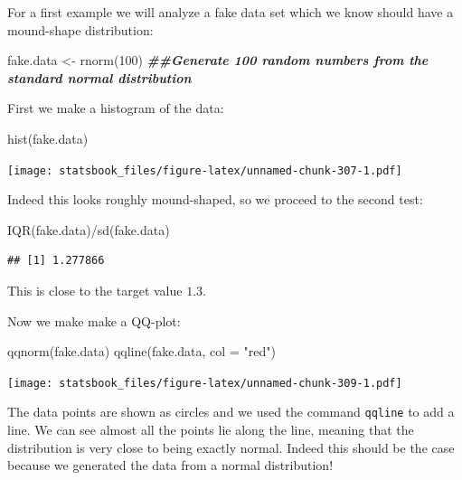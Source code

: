 \documentclass[
]{book}
\newenvironment{Shaded}{\begin{snugshade}}{\end{snugshade}}
\newcommand{\AttributeTok}[1]{\textcolor[rgb]{0.77,0.63,0.00}{#1}}
\newcommand{\DecValTok}[1]{\textcolor[rgb]{0.00,0.00,0.81}{#1}}
\newcommand{\DocumentationTok}[1]{\textcolor[rgb]{0.56,0.35,0.01}{\textbf{\textit{#1}}}}
\newcommand{\FunctionTok}[1]{\textcolor[rgb]{0.00,0.00,0.00}{#1}}
\newcommand{\NormalTok}[1]{#1}
\newcommand{\OtherTok}[1]{\textcolor[rgb]{0.56,0.35,0.01}{#1}}
\newcommand{\SpecialCharTok}[1]{\textcolor[rgb]{0.00,0.00,0.00}{#1}}
\newcommand{\StringTok}[1]{\textcolor[rgb]{0.31,0.60,0.02}{#1}}
\theoremstyle{definition}
\theoremstyle{definition}
\theoremstyle{definition}
\theoremstyle{definition}
\theoremstyle{remark}
\begin{document}
For a first example we will analyze a fake data set which we know should have a mound-shape distribution:

\begin{Shaded}
\begin{Highlighting}[]
\NormalTok{fake.data }\OtherTok{\textless{}{-}} \FunctionTok{rnorm}\NormalTok{(}\DecValTok{100}\NormalTok{)  }\DocumentationTok{\#\#Generate 100 random numbers from the standard normal distribution}
\end{Highlighting}
\end{Shaded}

First we make a histogram of the data:

\begin{Shaded}
\begin{Highlighting}[]
\FunctionTok{hist}\NormalTok{(fake.data)}
\end{Highlighting}
\end{Shaded}

\texttt{[image: statsbook\_files/figure-latex/unnamed-chunk-307-1.pdf]}

Indeed this looks roughly mound-shaped, so we proceed to the second test:

\begin{Shaded}
\begin{Highlighting}[]
\FunctionTok{IQR}\NormalTok{(fake.data)}\SpecialCharTok{/}\FunctionTok{sd}\NormalTok{(fake.data)}
\end{Highlighting}
\end{Shaded}

\begin{verbatim}
## [1] 1.277866
\end{verbatim}

This is close to the target value \(1.3\).

Now we make make a QQ-plot:

\begin{Shaded}
\begin{Highlighting}[]
\FunctionTok{qqnorm}\NormalTok{(fake.data)}
\FunctionTok{qqline}\NormalTok{(fake.data, }\AttributeTok{col =} \StringTok{"red"}\NormalTok{)}
\end{Highlighting}
\end{Shaded}

\texttt{[image: statsbook\_files/figure-latex/unnamed-chunk-309-1.pdf]}

The data points are shown as circles and we used the command \texttt{qqline} to add a line. We can see almost all the points lie along the line, meaning that the distribution is very close to being exactly normal. Indeed this should be the case because we generated the data from a normal distribution!
\end{document}
